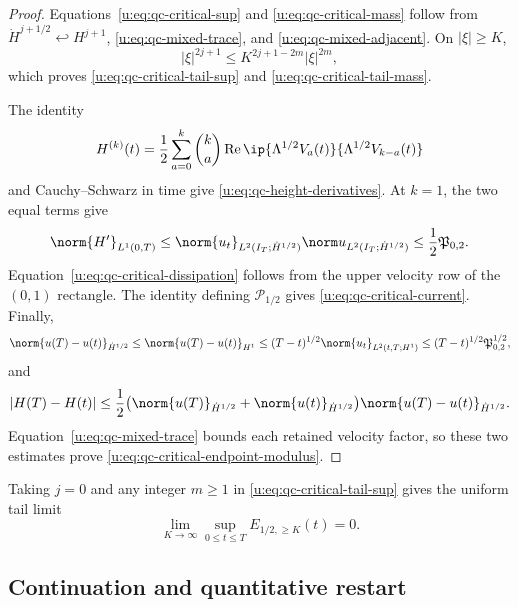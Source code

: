 \begin{proof}
Equations~\eqref{u:eq:qc-critical-sup} and
\eqref{u:eq:qc-critical-mass} follow from
\(\dot H^{j+1/2}\hookleftarrow H^{j+1}\),
\eqref{u:eq:qc-mixed-trace}, and \eqref{u:eq:qc-mixed-adjacent}.
On \(|\xi|\ge K\),
\[
 |\xi|^{2j+1}\le K^{2j+1-2m}|\xi|^{2m},
\]
which proves \eqref{u:eq:qc-critical-tail-sup} and
\eqref{u:eq:qc-critical-tail-mass}.

The identity
\[
 H^{(k)}(t)
 =\frac12\sum_{a=0}^{k}\binom ka
 \operatorname{Re}\ip{\Lambda^{1/2}V_a(t)}
 {\Lambda^{1/2}V_{k-a}(t)}
\]
and Cauchy--Schwarz in time give
\eqref{u:eq:qc-height-derivatives}.  At \(k=1\), the two equal terms give
\[
 \norm{H'}_{L^1(0,T)}
 \le\norm{u_t}_{L^2(I_T;\dot H^{1/2})}
     \norm u_{L^2(I_T;\dot H^{1/2})}
 \le\frac12\mathfrak P_{0,2}.
\]
Equation~\eqref{u:eq:qc-critical-dissipation} follows from the upper velocity
row of the \((0,1)\) rectangle.  The identity defining
\(\mathcal P_{1/2}\) gives \eqref{u:eq:qc-critical-current}.  Finally,
\[
 \norm{u(T)-u(t)}_{\dot H^{1/2}}
 \le\norm{u(T)-u(t)}_{H^1}
 \le(T-t)^{1/2}\norm{u_t}_{L^2(t,T;H^1)}
 \le(T-t)^{1/2}\mathfrak P_{0,2}^{1/2},
\]
and
\[
 |H(T)-H(t)|
 \le\frac12\bigl(
 \norm{u(T)}_{\dot H^{1/2}}+\norm{u(t)}_{\dot H^{1/2}}
 \bigr)\norm{u(T)-u(t)}_{\dot H^{1/2}}.
\]
Equation~\eqref{u:eq:qc-mixed-trace} bounds each retained velocity factor, so
these two estimates prove \eqref{u:eq:qc-critical-endpoint-modulus}.
\end{proof}

Taking \(j=0\) and any integer \(m\ge1\) in
\eqref{u:eq:qc-critical-tail-sup} gives the uniform tail limit
\begin{equation}
 \lim_{K\to\infty}\sup_{0\le t\le T}
 E_{1/2,\ge K}(t)=0.
 \label{u:eq:qc-critical-tail-extinction}
\end{equation}

\subsection{Continuation and quantitative restart}

